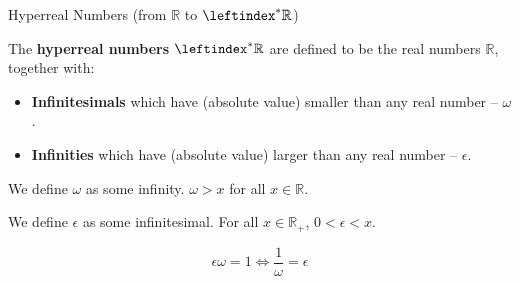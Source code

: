 \documentclass{beamer}
\newcommand{\ls}{\leftindex^*}
\newcommand{\RR}{\mathbb{R}}
\newcommand{\HR}{\ls{\RR}}
\newenvironment{remark}{
    \setbeamercolor{block title}{bg=orange!20, fg=orange}
    \begin{block}{Remark}}{\end{block}}
\begin{document}



\begin{frame}{Hyperreal Numbers (from \(\RR\) to \(\HR\))}\pause
    \begin{definition}
        The \textbf{hyperreal numbers} \(\HR\) are defined to be the real numbers \(\RR\), together with:\pause
        \begin{itemize}
            \item \textbf{Infinitesimals} which have (absolute value) smaller than any real number -- \(\omega\).\pause
            \item \textbf{Infinities} which have (absolute value) larger than any real number -- \(\epsilon\).\pause
        \end{itemize}
        We define \(\omega\) as some infinity. \(\omega > x\) for all \(x \in \RR\).\pause

        We define \(\epsilon\) as some infinitesimal. For all \(x \in \RR_{+}\), \(0 < \epsilon < x\).\pause

        \[
            \epsilon \omega = 1 \iff \frac{1}{\omega} = \epsilon
        \]
    \end{definition}
\end{frame}


\end{document}
